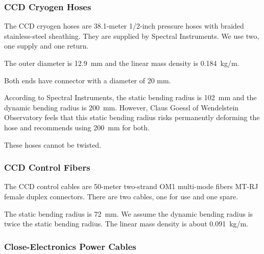 \documentclass{article}
\begin{document}

\subsubsection{CCD Cryogen Hoses}

The CCD cryogen hoses are 38.1-meter 1/2-inch pressure hoses with braided stainless-steel sheathing. They are supplied by Spectral Instruments. We use two, one supply and one return.


The outer diameter is 12.9~mm and the linear mass density is 0.184~kg/m.

Both ends have connector with a diameter of 20 mm.

According to Spectral Instruments, the static bending radius is 102~mm and the dynamic bending radius is 200~mm. However, Claus Goessl of Wendelstein Observatory feels that this static bending radius risks permanently deforming the hose and recommends using 200~mm for both.

These hoses cannot be twisted.

\subsubsection{CCD Control Fibers}

The CCD control cables are 50-meter two-strand OM1 multi-mode fibers MT-RJ female duplex connectors.  There are two cables, one for use and one spare. 

The static bending radius is 72~mm. We assume the dynamic bending radius is twice the static bending radius. The linear mass density is about 0.091~kg/m.

\subsubsection{Close-Electronics Power Cables}
\end{document}
